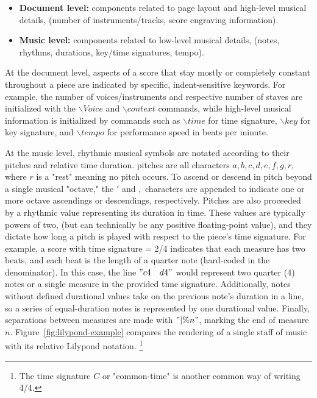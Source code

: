 \documentclass[review,sigconf]{acmart}
\begin{document}
\begin{itemize}
		\item \textbf{Document level:} components related to page layout and high-level musical details, (number of instruments/tracks, score engraving information).
		\item \textbf{Music level:} components related to low-level musical details, (notes, rhythms, durations, key/time signatures, tempo).
\end{itemize}

At the document level, aspects of a score that stay mostly or completely constant throughout a piece are indicated by specific, indent-sensitive keywords.
For example, the number of voices/instruments and respective number of staves are initialized with the $\backslash{Voice}$ and $\backslash{context}$ commands,
while high-level musical information is initialized by commands such as $\backslash{time}$ for time signature, $\backslash{key}$ for key signature, and $\backslash{tempo}$ for performance speed in beats per minute.  

At the music level, rhythmic musical symbols are notated according to their pitches and relative time duration.
pitches are all characters ${a, b, c, d, e, f, g, r}$, where $r$ is a "rest" meaning no pitch occurs.
To ascend or descend in pitch beyond a single musical "octave," the $'$ and $,$ characters are appended to indicate one or more octave ascendings or descendings, respectively.
Pitches are also proceeded by a rhythmic value representing its duration in time.
These values are typically powers of two, (but can technically be any positive floating-point value), and they dictate how long a pitch is played with respect to the piece's time signature.
For example, a score with time signature = 2/4 indicates that each measure has two beats, and each beat is the length of a quarter note (hard-coded in the denominator).
In this case, the line $"c4 \quad d4"$ would represent two quarter (4) notes or a single measure in the provided time signature.
Additionally, notes without defined durational values take on the previous note's duration in a line, so a series of equal-duration notes is represented by one durational value.
Finally, separations between measures are made with $"| \% n"$, marking the end of measure $n$.
Figure~\ref{fig:lilypond-example} compares the rendering of a single staff of music with its relative Lilypond notation.
\footnote{The time signature $C$ or "common-time" is another common way of writing 4/4.}
\end{document}
